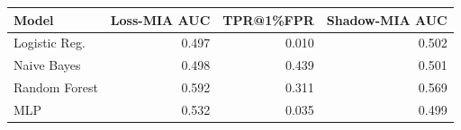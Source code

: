 \begin{tabular}{lrrr}
\toprule
Model & Loss-MIA AUC & TPR@1\%FPR & Shadow-MIA AUC \\
\midrule
Logistic Reg. & 0.497 & 0.010 & 0.502 \\
Naive Bayes & 0.498 & 0.439 & 0.501 \\
Random Forest & 0.592 & 0.311 & 0.569 \\
MLP & 0.532 & 0.035 & 0.499 \\
\bottomrule
\end{tabular}
